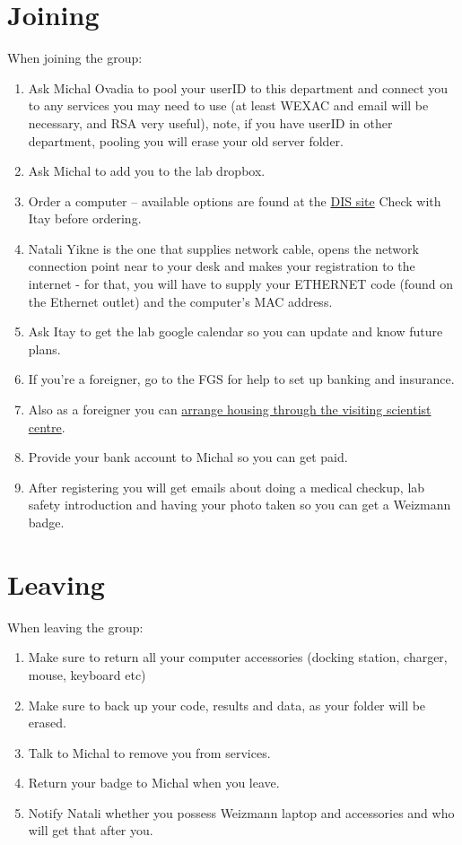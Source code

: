 \documentclass[]{book}
\providecommand{\tightlist}{%
  \setlength{\itemsep}{0pt}\setlength{\parskip}{0pt}}
\begin{document}
\section{Joining}\label{joining}

When joining the group:

\begin{enumerate}
\def\labelenumi{\arabic{enumi}.}
\tightlist
\item
  Ask Michal Ovadia to pool your userID to this department and connect
  you to any services you may need to use (at least WEXAC and email will
  be necessary, and RSA very useful), note, if you have userID in other
  department, pooling you will erase your old server folder.
\item
  Ask Michal to add you to the lab dropbox.
\item
  Order a computer -- available options are found at the
  \href{http://www.weizmann.ac.il/DIS/computing-hardware/pc/windows-laptops}{DIS
  site} Check with Itay before ordering.
\item
  Natali Yikne is the one that supplies network cable, opens the network
  connection point near to your desk and makes your registration to the
  internet - for that, you will have to supply your ETHERNET code (found
  on the Ethernet outlet) and the computer's MAC address.
\item
  Ask Itay to get the lab google calendar so you can update and know
  future plans.
\item
  If you're a foreigner, go to the FGS for help to set up banking and
  insurance.
\item
  Also as a foreigner you can
  \href{http://www.weizmann.ac.il/vs/}{arrange housing through the
  visiting scientist centre}.
\item
  Provide your bank account to Michal so you can get paid.
\item
  After registering you will get emails about doing a medical checkup,
  lab safety introduction and having your photo taken so you can get a
  Weizmann badge.
\end{enumerate}

\section{Leaving}\label{leaving}

When leaving the group:

\begin{enumerate}
\def\labelenumi{\arabic{enumi}.}
\tightlist
\item
  Make sure to return all your computer accessories (docking station,
  charger, mouse, keyboard etc)
\item
  Make sure to back up your code, results and data, as your folder will
  be erased.
\item
  Talk to Michal to remove you from services.
\item
  Return your badge to Michal when you leave.
\item
  Notify Natali whether you possess Weizmann laptop and accessories and
  who will get that after you.
\end{enumerate}
\end{document}
